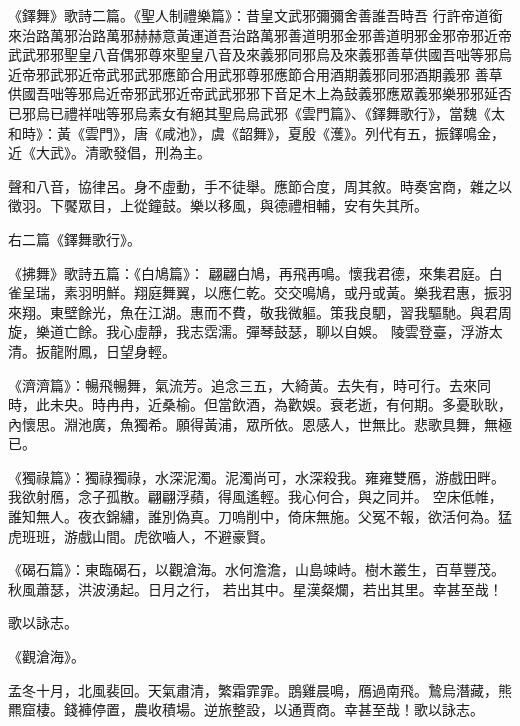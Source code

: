 \begin{pinyinscope}
 《鐸舞》歌詩二篇。《聖人制禮樂篇》：昔皇文武邪彌彌舍善誰吾時吾
 行許帝道銜來治路萬邪治路萬邪赫赫意黃運道吾治路萬邪善道明邪金邪善道明邪金邪帝邪近帝武武邪邪聖皇八音偶邪尊來聖皇八音及來義邪同邪烏及來義邪善草供國吾咄等邪烏近帝邪武邪近帝武邪武邪應節合用武邪尊邪應節合用酒期義邪同邪酒期義邪
 善草供國吾咄等邪烏近帝邪武邪近帝武武邪邪下音足木上為鼓義邪應眾義邪樂邪邪延否已邪烏已禮祥咄等邪烏素女有絕其聖烏烏武邪《雲門篇》、《鐸舞歌行》，當魏《太和時》：黃《雲門》，唐《咸池》，虞《韶舞》，夏殷《濩》。列代有五，振鐸鳴金，近《大武》。清歌發倡，刑為主。



 聲和八音，協律呂。身不虛動，手不徒舉。應節合度，周其敘。時奏宮商，雜之以徵羽。下饜眾目，上從鐘鼓。樂以移風，與德禮相輔，安有失其所。



 右二篇《鐸舞歌行》。



 《拂舞》歌詩五篇：《白鳩篇》：
 翩翩白鳩，再飛再鳴。懷我君德，來集君庭。白雀呈瑞，素羽明鮮。翔庭舞翼，以應仁乾。交交鳴鳩，或丹或黃。樂我君惠，振羽來翔。東壁餘光，魚在江湖。惠而不費，敬我微軀。策我良駟，習我驅馳。與君周旋，樂道亡餘。我心虛靜，我志霑濡。彈琴鼓瑟，聊以自娛。
 陵雲登臺，浮游太清。扳龍附鳳，日望身輕。



 《濟濟篇》：暢飛暢舞，氣流芳。追念三五，大綺黃。去失有，時可行。去來同時，此未央。時冉冉，近桑榆。但當飲酒，為歡娛。衰老逝，有何期。多憂耿耿，
 內懷思。淵池廣，魚獨希。願得黃浦，眾所依。恩感人，世無比。悲歌具舞，無極已。



 《獨祿篇》：獨祿獨祿，水深泥濁。泥濁尚可，水深殺我。雍雍雙鴈，游戲田畔。我欲射鴈，念子孤散。翩翩浮蘋，得風遙輕。我心何合，與之同并。
 空床低帷，誰知無人。夜衣錦繡，誰別偽真。刀嗚削中，倚床無施。父冤不報，欲活何為。猛虎班班，游戲山間。虎欲嚙人，不避豪賢。



 《碣石篇》：東臨碣石，以觀滄海。水何澹澹，山島竦峙。樹木叢生，百草豐茂。秋風蕭瑟，洪波湧起。日月之行，
 若出其中。星漢粲爛，若出其里。幸甚至哉！



 歌以詠志。



 《觀滄海》。



 孟冬十月，北風裴回。天氣肅清，繁霜霏霏。鵾雞晨鳴，鴈過南飛。鷙烏潛藏，熊羆窟棲。錢褲停置，農收積場。逆旅整設，以通賈商。幸甚至哉！歌以詠志。




\end{pinyinscope}
